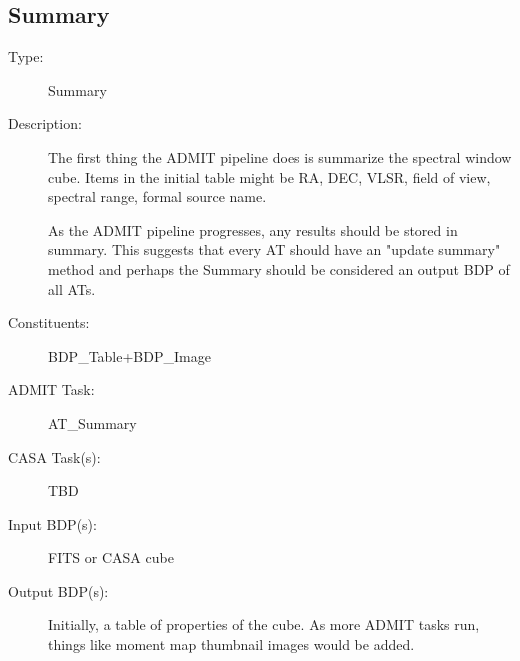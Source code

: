 
\subsection{Summary}
\begin{description}
\item[Type:] Summary
\item[Description:] 
The first thing the ADMIT pipeline does is summarize the spectral window cube.  Items in the initial table might be RA, DEC, VLSR, field of view, spectral range, formal source name.  

As the ADMIT pipeline progresses, any results should be stored in summary.
This suggests that every AT should have an "update summary" method
and perhaps the Summary should be considered an output BDP of all ATs.

\item[Constituents:] BDP\_Table+BDP\_Image
\item[ADMIT Task:] AT\_Summary
\item[CASA Task(s):]  TBD
\item[Input BDP(s):] FITS or CASA cube
\item[Output BDP(s):] Initially, a table of properties of the cube.  As more ADMIT tasks run, things like moment map thumbnail images would be added.
\end{description}

